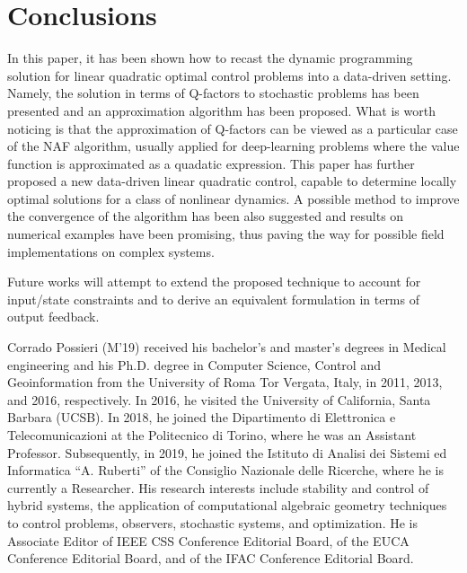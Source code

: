 \documentclass[10pt]{IEEEtran}      %
\theoremstyle{theorem}
\theoremstyle{remark}
\begin{document}
\section{Conclusions}\label{sec:con}
In this paper, it has been shown how to recast the dynamic programming solution for linear quadratic optimal control problems into a data-driven setting. Namely, the solution in terms of Q-factors to stochastic problems has been presented and an approximation algorithm has been proposed. What is worth noticing is that the approximation of Q-factors can be viewed as a particular case of the NAF algorithm, usually applied for deep-learning problems where the value function is approximated as a quadatic expression. This  paper has further proposed a new data-driven linear quadratic control, capable to determine locally optimal solutions for a class of nonlinear dynamics. A possible method to improve the convergence of the algorithm has been also suggested and results on numerical examples have been promising, thus paving the way for possible field implementations on complex systems.

Future works will attempt to extend the proposed technique to account for input/state constraints
and to derive an equivalent formulation in terms of output feedback.




\begin{IEEEbiography}
{Corrado Possieri} (M'19)
received his bachelor's and master's degrees in Medical engineering and his Ph.D. degree in Computer Science, Control and Geoinformation from the University of Roma Tor Vergata, Italy, in 2011, 2013, and 2016, respectively.  In 2016, he visited the University of California, Santa Barbara (UCSB). In 2018, he joined the Dipartimento di Elettronica e Telecomunicazioni at the Politecnico di Torino, where he was an Assistant Professor. Subsequently, in 2019, he joined the Istituto di Analisi dei Sistemi ed Informatica ``A. Ruberti'' of the Consiglio Nazionale delle Ricerche, where he is currently a Researcher.
His research interests include stability and control of hybrid systems, the application of computational algebraic geometry techniques to control problems, observers, stochastic systems, and optimization.
He is Associate Editor of IEEE CSS Conference Editorial Board, of the EUCA Conference Editorial Board, and of the IFAC Conference Editorial Board.
\end{IEEEbiography}
\end{document}
